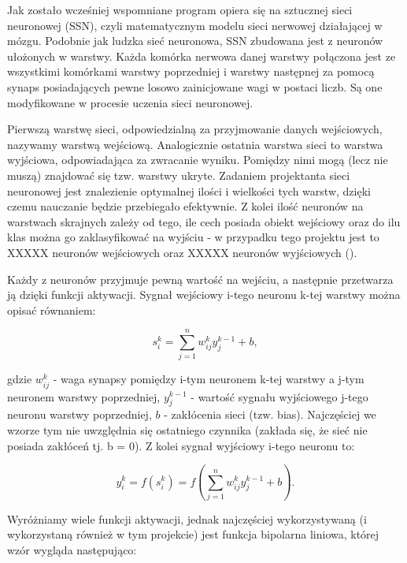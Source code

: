 \documentclass[12pt,a4paper]{article}
\begin{document}
\hspace{20pt} Jak zostało wcześniej wspomniane program opiera się na sztucznej sieci neuronowej (SSN), czyli matematycznym modelu sieci nerwowej działającej w mózgu. Podobnie jak ludzka sieć neuronowa, SSN zbudowana jest z neuronów ułożonych w warstwy. Każda komórka nerwowa danej warstwy połączona jest ze wszystkimi komórkami warstwy poprzedniej i warstwy następnej za pomocą synaps posiadających pewne losowo zainicjowane wagi w postaci liczb. Są one modyfikowane w procesie uczenia sieci neuronowej.

\vspace{5pt}
Pierwszą warstwę sieci, odpowiedzialną za przyjmowanie danych wejściowych, nazywamy warstwą wejściową. Analogicznie ostatnia warstwa sieci to warstwa wyjściowa, odpowiadająca za zwracanie wyniku. Pomiędzy nimi mogą (lecz nie muszą) znajdować się tzw. warstwy ukryte. Zadaniem projektanta sieci neuronowej jest znalezienie optymalnej ilości i wielkości tych warstw, dzięki czemu nauczanie będzie przebiegało efektywnie. Z kolei ilość neuronów na warstwach skrajnych zależy od tego, ile cech posiada obiekt wejściowy oraz do ilu klas można go zaklasyfikować na wyjściu - w przypadku tego projektu jest to XXXXX neuronów wejściowych oraz XXXXX neuronów wyjściowych ().

\vspace{5pt}
Każdy z neuronów przyjmuje pewną wartość na wejściu, a następnie przetwarza ją dzięki funkcji aktywacji. Sygnał wejściowy i-tego neuronu k-tej warstwy można opisać równaniem:

\begin{equation*}
    s^k_i = \sum_{j=1}^{n}w^k_{ij} y^{k-1}_{j} + b,
\end{equation*}

\noindent gdzie $w^k_{ij}$ - waga synapsy pomiędzy i-tym neuronem k-tej warstwy a j-tym neuronem warstwy poprzedniej, $y^{k-1}_{j}$ - wartość sygnału wyjściowego j-tego neuronu warstwy poprzedniej, $b$ - zakłócenia sieci (tzw. bias). Najczęściej we wzorze tym nie uwzględnia się ostatniego czynnika (zakłada się, że sieć nie posiada zakłóceń tj. b = 0). Z kolei sygnał wyjściowy i-tego neuronu to:

\begin{equation*}
    y^k_i = f(s^k_i) = f(\sum_{j=1}^{n}w^k_{ij} y^{k-1}_{j} + b).
\end{equation*}

Wyróżniamy wiele funkcji aktywacji, jednak najczęściej wykorzystywaną (i wykorzystaną również w tym projekcie) jest funkcja bipolarna liniowa, której wzór wygląda następująco:
\end{document}
